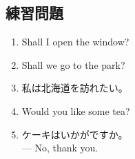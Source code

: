 \subsection{練習問題}
    \begin{enumerate}
        \item Shall I open the window?
        \vspace{0.5em}
        \item Shall we go to the park?
        \vspace{0.5em}
        \item 私は北海道を訪れたい。
        \vspace{0.5em}
        \item Would you like some tea?
        \vspace{0.5em}
        \item ケーキはいかがですか。 \\
        \hspace{2em}--- No, thank you.
    \end{enumerate}
